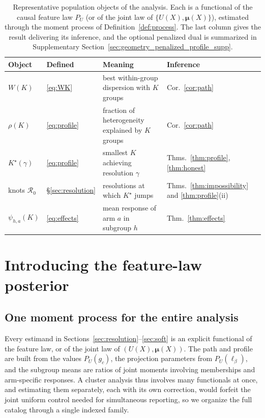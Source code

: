 \documentclass[11pt]{article}
\newcommand{\bmu}{\bm\mu}
\begin{document}
\begin{table}[ht!]
\centering
\caption{Representative population objects of the analysis. Each is a functional of the causal feature law $P_U$ (or of the joint law of $\{U(X),\bmu(X)\}$), estimated through the moment process of Definition~\ref{def:process}. The last column gives the result delivering its inference, and the optional penalized dual is summarized in Supplementary Section~\ref{sec:geometry_penalized_profile_supp}.}
\label{tab:cast}
\small
\begin{tabular}{llll}
\toprule
Object & Defined & Meaning & Inference\\
\midrule
$W(K)$ & \eqref{eq:WK} & best within-group dispersion with $K$ groups & Cor.~\ref{cor:path}\\
$\rho(K)$ & \eqref{eq:profile} & fraction of heterogeneity explained by $K$ groups & Cor.~\ref{cor:path}\\
$K^\star(\gamma)$ & \eqref{eq:profile} & smallest $K$ achieving resolution $\gamma$ & Thms.~\ref{thm:profile}, \ref{thm:honest}\\
knots $\mathcal R_0$ & \S\ref{sec:resolution} & resolutions at which $K^\star$ jumps & Thms.~\ref{thm:impossibility} and \ref{thm:profile}(ii)\\
$\psi_{h,a}(K)$ & \eqref{eq:effects} & mean response of arm $a$ in subgroup $h$ & Thm.~\ref{thm:effects}\\
\bottomrule
\end{tabular}
\end{table}

\section{Introducing the feature-law posterior}\label{sec:method}

\subsection{One moment process for the entire analysis}\label{sec:moment}

Every estimand in Sections~\ref{sec:resolution}--\ref{sec:soft} is an explicit functional of the feature law, or of the joint law of $(U(X),\bmu(X))$. The path and profile are built from the values $P_U(g_c)$, the projection parameters from $P_U(\ell_\beta)$, and the subgroup means are ratios of joint moments involving memberships and arm-specific responses. A cluster analysis thus involves many functionals at once, and estimating them separately, each with its own correction, would forfeit the joint uniform control needed for simultaneous reporting, so we organize the full catalog through a single indexed family.
\end{document}
